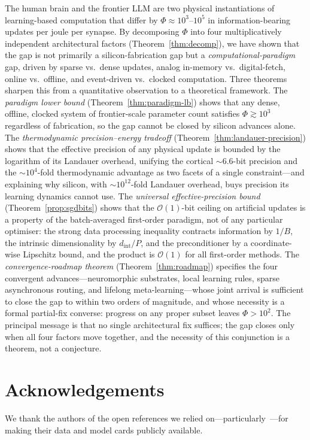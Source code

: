 \documentclass[11pt]{article}
\theoremstyle{definition}
\theoremstyle{remark}
\begin{document}
The human brain and the frontier LLM are two physical instantiations
of learning-based computation that differ by $\Phi\approx 10^{3}$--$10^{5}$
in information-bearing updates per joule per synapse.  By
decomposing $\Phi$ into four multiplicatively independent
architectural factors (Theorem~\ref{thm:decomp}), we have shown that
the gap is not primarily a silicon-fabrication gap but a
\emph{computational-paradigm} gap, driven by sparse vs.\ dense
updates, analog in-memory vs.\ digital-fetch, online vs.\ offline,
and event-driven vs.\ clocked computation.  Three theorems sharpen
this from a quantitative observation to a theoretical framework.
The \emph{paradigm lower bound} (Theorem~\ref{thm:paradigm-lb}) shows
that any dense, offline, clocked system of frontier-scale parameter
count satisfies $\Phi\gtrsim 10^{3}$ regardless of fabrication, so
the gap cannot be closed by silicon advances alone.  The
\emph{thermodynamic precision--energy tradeoff}
(Theorem~\ref{thm:landauer-precision}) shows that the effective
precision of any physical update is bounded by the logarithm of its
Landauer overhead, unifying the cortical $\sim\!6.6$-bit precision
and the $\sim\!10^{4}$-fold thermodynamic advantage as two facets of
a single constraint---and explaining why silicon, with
$\sim\!10^{12}$-fold Landauer overhead, buys precision its learning
dynamics cannot use.  The \emph{universal effective-precision bound}
(Theorem~\ref{prop:sgdbits}) shows that the $\mathcal{O}(1)$-bit
ceiling on artificial updates is a property of the batch-averaged
first-order paradigm, not of any particular optimiser: the strong
data processing inequality contracts information by $1/B$, the
intrinsic dimensionality by $d_{\mathrm{int}}/P$, and the
preconditioner by a coordinate-wise Lipschitz bound, and the product
is $\mathcal{O}(1)$ for all first-order methods.  The
\emph{convergence-roadmap theorem} (Theorem~\ref{thm:roadmap})
specifies the four convergent advances---neuromorphic substrates,
local learning rules, sparse asynchronous routing, and lifelong
meta-learning---whose joint arrival is sufficient to close the gap
to within two orders of magnitude, and whose necessity is a formal
partial-fix converse: progress on any proper subset leaves
$\Phi>10^{2}$.  The principal message is that no single architectural
fix suffices; the gap closes only when all four factors move
together, and the necessity of this conjunction is a theorem, not a
conjecture.

\section*{Acknowledgements}
We thank the authors of the open references we relied
on---particularly~\cite{bartol2015nanoconnectomic,
brainfacts2019energy, openai2023gpt4, meta2024llama31}---for making
their data and model cards publicly available.
\end{document}
